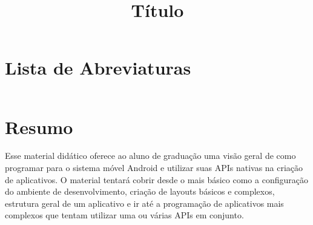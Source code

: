\documentclass[a4paper,12pt,brazil,doubleside]{book}
\title{Título}
\begin{document}


\pagestyle{empty}

\cleardoublepage

\onehalfspace

\pagestyle{plain}

\setcounter{tocdepth}{1} %
\tableofcontents
\clearpage %
\thispagestyle{empty}

\listoffigures
{}
\clearpage %
\thispagestyle{empty}

\listoftables
{}
\clearpage %
\thispagestyle{empty}

\lstlistoflistings
{}
\clearpage %
\thispagestyle{empty}

\chapter*{Lista de Abreviaturas}
\begin{longtable}{ll}
\end{longtable}


\chapter*{Resumo}

\begin{singlespace}
Esse material didático oferece ao aluno de graduação uma visão geral de como programar para o sistema móvel Android e utilizar suas APIs nativas na criação de aplicativos. O material tentará cobrir desde o mais básico como a configuração do ambiente de desenvolvimento, criação de layouts básicos e complexos, estrutura geral de um aplicativo e ir até a programação de aplicativos mais complexos que tentam utilizar uma ou várias APIs em conjunto.
\end{singlespace}

\clearpage %
\thispagestyle{empty}

\thispagestyle{empty}

\doublespace

\cleardoublepage
\end{document}
